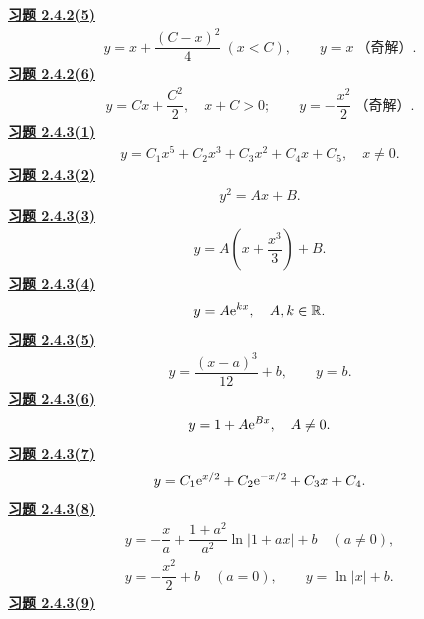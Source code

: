 \noindent\textbf{\hyperref[q:2.4.2(5)]{习题 2.4.2(5)}}
\[\begin{gathered}y=x+\dfrac{(C-x)^2}{4}\ (x<C),\qquad y=x\ \text{（奇解）}.\end{gathered}\]
\noindent\textbf{\hyperref[q:2.4.2(6)]{习题 2.4.2(6)}}
\[\begin{gathered}y=Cx+\dfrac{C^2}{2},\quad x+C>0;\qquad
 y=-\dfrac{x^2}{2}\ \text{（奇解）}.\end{gathered}\]
\noindent\textbf{\hyperref[q:2.4.3(1)]{习题 2.4.3(1)}}
\[\begin{gathered}y=C_1x^5+C_2x^3+C_3x^2+C_4x+C_5,\quad x\ne0.\end{gathered}\]
\noindent\textbf{\hyperref[q:2.4.3(2)]{习题 2.4.3(2)}}
\[\begin{gathered}y^2=Ax+B.\end{gathered}\]
\noindent\textbf{\hyperref[q:2.4.3(3)]{习题 2.4.3(3)}}
\[\begin{gathered}y=A\left(x+\dfrac{x^3}{3}\right)+B.\end{gathered}\]
\noindent\textbf{\hyperref[q:2.4.3(4)]{习题 2.4.3(4)}}
\[\begin{gathered}y=A\mathrm e^{kx},\quad A,k\in\mathbb R.\end{gathered}\]
\noindent\textbf{\hyperref[q:2.4.3(5)]{习题 2.4.3(5)}}
\[\begin{gathered}y=\dfrac{(x-a)^3}{12}+b,\qquad y=b.\end{gathered}\]
\noindent\textbf{\hyperref[q:2.4.3(6)]{习题 2.4.3(6)}}
\[\begin{gathered}y=1+A\mathrm e^{Bx},\quad A\ne0.\end{gathered}\]
\noindent\textbf{\hyperref[q:2.4.3(7)]{习题 2.4.3(7)}}
\[\begin{gathered}y=C_1\mathrm e^{x/2}+C_2\mathrm e^{-x/2}+C_3x+C_4.\end{gathered}\]
\noindent\textbf{\hyperref[q:2.4.3(8)]{习题 2.4.3(8)}}
\[\begin{gathered}y=-\dfrac xa+\dfrac{1+a^2}{a^2}\ln|1+ax|+b\quad(a\ne0),\\
y=-\dfrac{x^2}{2}+b\quad(a=0),\qquad y=\ln|x|+b.\end{gathered}\]
\noindent\textbf{\hyperref[q:2.4.3(9)]{习题 2.4.3(9)}}

